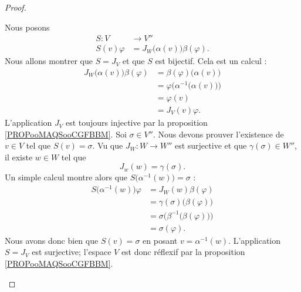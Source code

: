 \begin{proof}
\begin{subproof}
    \spitem[Le \( S\)]
    Nous posons
    \begin{equation}
        \begin{aligned}
            S\colon V   & \to V''                                  \\
            S(v)\varphi & =J_W\big( \alpha(v) \big)\beta(\varphi).
        \end{aligned}
    \end{equation}
    Nous allons montrer que \( S=J_V\) et que \( S\) est bijectif.
    \spitem[\( S=J_V\)]
    Cela est un calcul :
    \begin{subequations}
        \begin{align}
            J_W\big( \alpha(v) \big)\beta(\varphi) & =\beta(\varphi)\big( \alpha(v) \big)                 \\
                                                   & =\varphi\Big( \alpha^{-1}\big( \alpha(v) \big) \Big) \\
                                                   & =\varphi(v)                                          \\
                                                   & =J_V(v)\varphi.
        \end{align}
    \end{subequations}
    L'application \( J_V\) est toujours injective par la proposition \ref{PROPooMAQSooCGFBBM}.
    Soi \( \sigma\in V''\). Nous devons prouver l'existence de \( v\in V\) tel que \( S(v)=\sigma\). Vu que \( J_W\colon W\to W''\) est surjective et que \( \gamma(\sigma)\in W''\), il existe \( w\in W\) tel que
    \begin{equation}
        J_w(w)=\gamma(\sigma).
    \end{equation}
    Un simple calcul montre alors que \( S\big( \alpha^{-1}(w) \big)=\sigma\) :
    \begin{subequations}
        \begin{align}
            S\big( \alpha^{-1}(w) \big)\varphi & =J_W(w)\beta(\varphi)                                   \\
                                               & =\gamma(\sigma)\big( \beta(\varphi) \big)               \\
                                               & =\sigma\Big( \beta^{-1}\big( \beta(\varphi) \big) \Big) \\
                                               & =\sigma(\varphi).
        \end{align}
    \end{subequations}
    Nous avons donc bien que \( S(v)=\sigma\) en posant \( v=\alpha^{-1}(w)\).
    \spitem[Conclusion]
    L'application \( S=J_V\) est surjective; l'espace \( V\) est donc réflexif par la proposition \ref{PROPooMAQSooCGFBBM}.
\end{subproof}
\end{proof}

